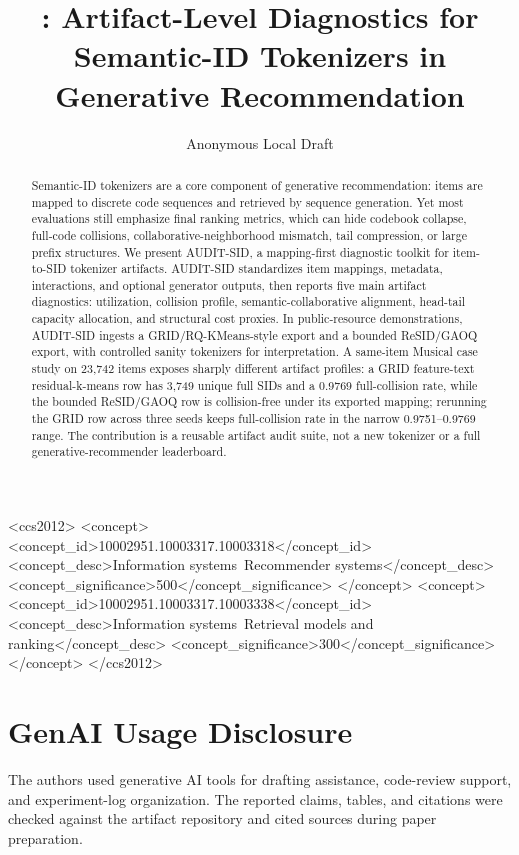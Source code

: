 \documentclass[sigconf,review,anonymous]{acmart}
\title{\tool: Artifact-Level Diagnostics for Semantic-ID Tokenizers in Generative Recommendation}
\author{Anonymous Local Draft}
\affiliation{%
  \institution{Anonymous Institution}
  \country{}
}
\newcommand{\tool}{AUDIT-SID\xspace}
\newcommand{\sid}{SID\xspace}
\begin{document}
\begin{CCSXML}
<ccs2012>
 <concept>
  <concept_id>10002951.10003317.10003318</concept_id>
  <concept_desc>Information systems~Recommender systems</concept_desc>
  <concept_significance>500</concept_significance>
 </concept>
 <concept>
  <concept_id>10002951.10003317.10003338</concept_id>
  <concept_desc>Information systems~Retrieval models and ranking</concept_desc>
  <concept_significance>300</concept_significance>
 </concept>
</ccs2012>
\end{CCSXML}


\begin{abstract}
Semantic-ID tokenizers are a core component of generative recommendation:
items are mapped to discrete code sequences and retrieved by sequence
generation. Yet most evaluations still emphasize final ranking metrics, which
can hide codebook collapse, full-code collisions, collaborative-neighborhood
mismatch, tail compression, or large prefix structures. We present
\tool, a mapping-first diagnostic toolkit for item-to-\sid tokenizer
artifacts. \tool standardizes item mappings, metadata, interactions, and
optional generator outputs, then reports five main artifact diagnostics:
utilization, collision profile, semantic-collaborative alignment, head-tail
capacity allocation, and structural cost proxies. In public-resource
demonstrations, \tool ingests a GRID/RQ-KMeans-style export and a bounded
ReSID/GAOQ export, with controlled sanity tokenizers for interpretation. A
same-item Musical case study on 23,742 items exposes sharply different artifact profiles: a
GRID feature-text residual-k-means row has 3,749 unique full \sid{}s and a
0.9769 full-collision rate, while the bounded ReSID/GAOQ row is
collision-free under its exported mapping; rerunning the GRID row across three
seeds keeps full-collision rate in the narrow 0.9751--0.9769 range. The contribution is a reusable
artifact audit suite, not a new tokenizer or a full generative-recommender
leaderboard.
\end{abstract}

\maketitle






\clearpage



\section*{GenAI Usage Disclosure}
The authors used generative AI tools for drafting assistance, code-review
support, and experiment-log organization. The reported claims, tables, and
citations were checked against the artifact repository and cited sources during
paper preparation.
\end{document}
